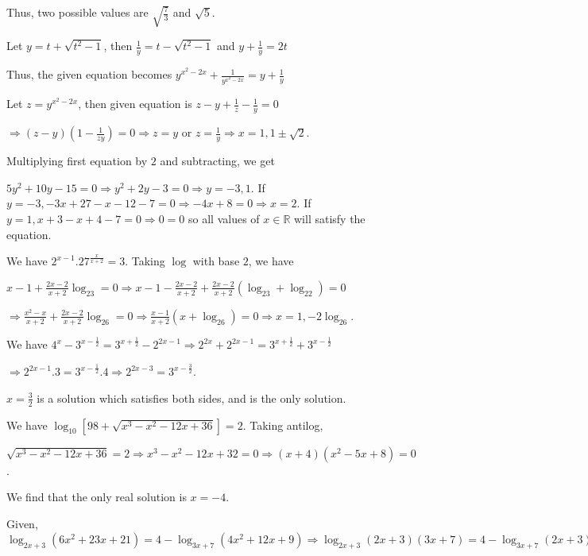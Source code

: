   Thus, two possible values are $\sqrt{\frac{7}{3}}$ and $\sqrt{5}$.
\item Let $y = t + \sqrt{t^2 - 1}$, then $\frac{1}{y} = t - \sqrt{t^2 - 1}$ and $y + \frac{1}{y} = 2t$

  Thus, the given equation becomes $y^{x^2 - 2x} + \frac{1}{y^{x^2 - 2x}} = y + \frac{1}{y}$

  Let $z = y^{x^2 - 2x}$, then given equation is $z - y + \frac{1}{z} - \frac{1}{y} = 0$

  $\Rightarrow (z - y)\left(1 - \frac{1}{zy}\right) = 0\Rightarrow z = y$ or $z = \frac{1}{y}\Rightarrow x =
  1, 1\pm\sqrt{2}$.
\item Multiplying first equation by $2$ and subtracting, we get

  $5y^2 + 10y -15 = 0 \Rightarrow y^2 + 2y - 3 = 0 \Rightarrow y = -3, 1$. If $y = -3, -3x + 27 - x - 12 - 7
  = 0 \Rightarrow -4x + 8 = 0\Rightarrow x = 2$. If $y = 1, x + 3 - x + 4 - 7 = 0\Rightarrow 0 = 0$ so all
  values of $x\in\mathbb{R}$ will satisfy the equation.
\item We have $2^{x - 1}.27^{\tfrac{x}{x + 2}} = 3$. Taking $\log$ with base $2$, we have

  $x - 1 + \frac{2x - 2}{x + 2}\log_23 = 0 \Rightarrow x - 1 - \frac{2x - 2}{x + 2} + \frac{2x - 2}{x +
  2}(\log_23 + \log_22) = 0$

  $\Rightarrow \frac{x^2 - x}{x + 2} + \frac{2x - 2}{x + 2}\log_26 = 0\Rightarrow \frac{x - 1}{x + 2}(x +
  \log_26) = 0\Rightarrow x = 1, -2\log_26$.
\item We have $4^x - 3^{x - \tfrac{1}{2}} = 3^{x + \tfrac{1}{2}} - 2^{2x - 1} \Rightarrow 2^{2x} + 2^{2x -
  1} = 3^{x + \frac{1}{2}} + 3^{x - \frac{1}{2}}$

  $\Rightarrow 2^{2x - 1}.3 = 3^{x - \frac{1}{2}}.4 \Rightarrow 2^{2x - 3} = 3^{x - \frac{3}{2}}$.

  $x = \frac{3}{2}$ is a solution which satisfies both sides, and is the only solution.
\item We have $\log_{10}[98 + \sqrt{x^3 - x^2 - 12x + 36}] = 2$. Taking antilog,

  $\sqrt{x^3 - x^2 - 12x + 36} = 2 \Rightarrow x^3 - x^2 - 12x + 32 = 0 \Rightarrow (x + 4)(x^2 - 5x + 8) =
  0$.

  We find that the only real solution is $x = -4$.
\item Given, $\log_{2x + 3}(6x^2 + 23x + 21) = 4 - \log_{3x + 7}(4x^2 + 12x + 9) \Rightarrow \log_{2x +
  3}(2x + 3)(3x + 7) = 4 - \log_{3x + 7}(2x + 3)^2$

